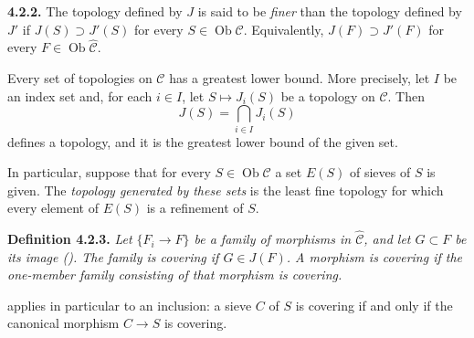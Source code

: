 \medskip
\noindent{}\textbf{4.2.2.}
The topology defined by \(J\) is said to be \emph{finer} than the topology
defined by \(J'\) if
\(J(S)\supset J'(S)\) for every
\(S\in\operatorname{Ob}\mathscr C\). Equivalently,
\(J(F)\supset J'(F)\) for every
\(F\in\operatorname{Ob}\widehat{\mathscr C}\).

Every set of topologies on \(\mathscr C\) has a greatest lower bound. More
precisely, let \(I\) be an index set and, for each \(i\in I\), let
\(S\mapsto J_i(S)\) be a topology on \(\mathscr C\). Then
\[
 J(S)=\bigcap_{i\in I}J_i(S)
\]
defines a topology, and it is the greatest lower bound of the given set.

In particular, suppose that for every
\(S\in\operatorname{Ob}\mathscr C\) a set \(E(S)\) of sieves of \(S\) is
given. The \emph{topology generated by these sets} is the least fine
topology for which every element of \(E(S)\) is a refinement of \(S\).

\medskip
\noindent{}\textbf{Definition 4.2.3.}
\textit{Let \(\{F_i\to F\}\) be a family of morphisms in
\(\widehat{\mathscr C}\), and let \(G\subset F\) be its image (). The
family is \emph{covering} if \(G\in J(F)\). A morphism is covering if the
one-member family consisting of that morphism is covering.}

 applies in particular to an inclusion: a sieve \(C\) of
\(S\) is covering if and only if the canonical morphism \(C\to S\) is
covering.

